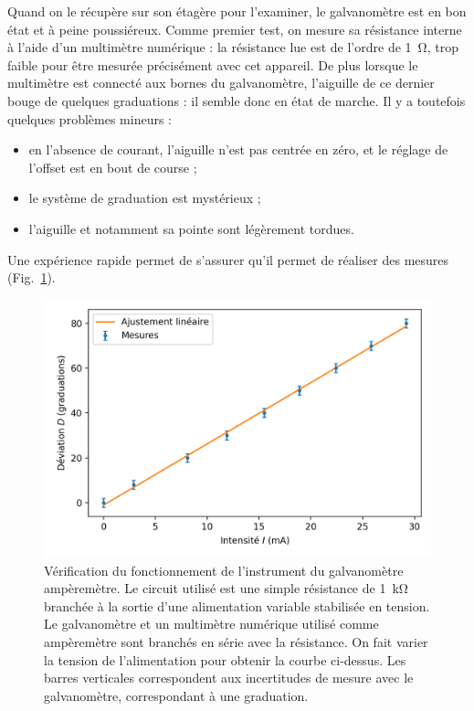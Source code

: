 \documentclass[12pt,a4paper,fleqn]{article}
\begin{document}
Quand on le récupère sur son étagère pour l'examiner, le galvanomètre est en bon état et à peine poussiéreux.
Comme premier test, on mesure sa résistance interne à l'aide d'un multimètre numérique : la résistance lue est de l'ordre de \SI{1}{\ohm}, trop faible pour être mesurée précisément avec cet appareil.
De plus lorsque le multimètre est connecté aux bornes du galvanomètre, l'aiguille de ce dernier bouge de quelques graduations : il semble donc en état de marche.
Il y a toutefois quelques problèmes mineurs :
\begin{itemize}
    \item en l'absence de courant, l'aiguille n'est pas centrée en zéro, et le réglage de l'\og offset \fg{} est en bout de course ;
    \item le système de graduation est mystérieux ;
    \item l'aiguille et notamment sa pointe sont légèrement tordues.
\end{itemize}
Une expérience rapide permet de s'assurer qu'il permet de réaliser des mesures (Fig.~\ref{fig:galva_amp_mes}).

\begin{figure}[htbp]
    \center
    \includegraphics[scale=1]{images/mesure.png}
    \caption{Vérification du fonctionnement de l'instrument du galvanomètre ampèremètre.
    Le circuit utilisé est une simple résistance de \SI{1}{\kilo\ohm} branchée à la sortie d'une alimentation variable stabilisée en tension.
    Le galvanomètre et un multimètre numérique utilisé comme ampèremètre sont branchés en série avec la résistance.
    On fait varier la tension de l'alimentation pour obtenir la courbe ci-dessus.
    Les barres verticales correspondent aux incertitudes de mesure avec le galvanomètre, correspondant à une graduation.}
    \label{fig:galva_amp_mes}
\end{figure}
\end{document}
